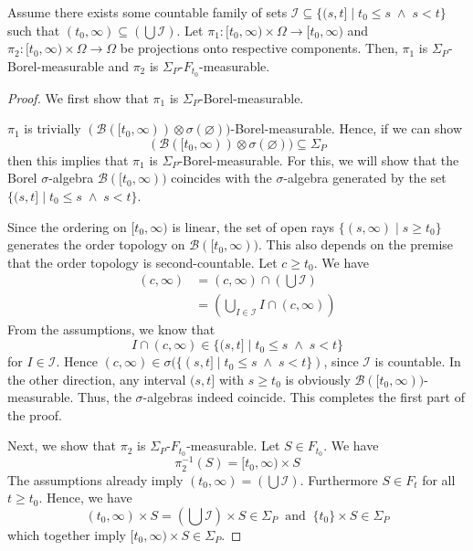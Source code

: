 \begin{lemma}
	Assume there exists some countable family of sets $\mathcal{I} \subseteq \{(s, t] \;\vert\; t_0 \le s \;\wedge\; s < t\}$ such that $(t_0, \infty) \subseteq (\bigcup \mathcal{I})$. Let $\pi_1 : [t_0, \infty) \times \Omega \rightarrow [t_0, \infty)$ and $\pi_2 : [t_0, \infty) \times \Omega \rightarrow \Omega$ be projections onto respective components. Then, $\pi_1$ is $\Sigma_P$-Borel-measurable and $\pi_2$ is $\Sigma_P$-$F_{t_0}$-measurable.
\end{lemma}
\begin{proof}
	We first show that $\pi_1$ is $\Sigma_P$-Borel-measurable.
	
	$\pi_1$ is trivially $(\mathcal{B}([t_0,\infty)) \otimes \sigma(\varnothing))$-Borel-measurable. Hence, if we can show 
	\[
		(\mathcal{B}([t_0,\infty)) \otimes \sigma(\varnothing)) \subseteq \Sigma_P
	\]
	then this implies that $\pi_1$ is $\Sigma_P$-Borel-measurable. For this, we will show that the Borel $\sigma$-algebra $\mathcal{B}([t_0,\infty))$ coincides with the $\sigma$-algebra generated by the set $\{(s,t] \;\vert\; t_0 \le s \;\wedge\; s < t\}$.
	
	Since the ordering on $[t_0, \infty)$ is linear, the set of open rays $\{(s,\infty) \;\vert\; s \ge t_0\}$ generates the order topology on $\mathcal{B}([t_0,\infty))$. This also depends on the premise that the order topology is second-countable. Let $c \ge t_0$. We have
	\begin{align*}
		(c, \infty) &= (c, \infty) \cap (\bigcup \mathcal{I}) \\
		&= (\bigcup_{I \in \mathcal{I}} I \cap (c, \infty))
	\end{align*}
	From the assumptions, we know that 
	\[
		I \cap (c, \infty) \in \{(s, t] \;\vert\; t_0 \le s \;\wedge\; s < t\}
	\]
	for $I \in \mathcal{I}$. Hence $(c, \infty) \in \sigma(\{(s,t] \;\vert\; t_0 \le s \;\wedge\; s < t\})$, since $\mathcal{I}$ is countable.
	In the other direction, any interval $(s,t]$ with $s \ge t_0$ is obviously $\mathcal{B}([t_0,\infty))$-measurable. Thus, the $\sigma$-algebras indeed coincide. This completes the first part of the proof.
	
	Next, we show that $\pi_2$ is $\Sigma_P$-$F_{t_0}$-measurable.
	Let $S \in F_{t_0}$. We have
	\[
		\pi_2^{-1}(S) = [t_0, \infty) \times S
	\]
	The assumptions already imply $(t_0, \infty) = (\bigcup \mathcal{I})$. Furthermore $S \in F_t$ for all $t \ge t_0$. Hence, we have
	\[
		(t_0, \infty) \times S = (\bigcup \mathcal{I}) \times S \in \Sigma_P \;\;\textrm{and}\;\; \{t_0\} \times S \in \Sigma_P
	\]
	which together imply $[t_0, \infty) \times S \in \Sigma_P$.
\end{proof}

